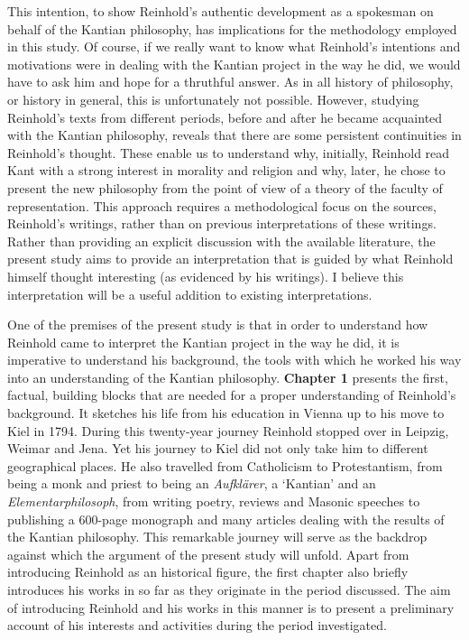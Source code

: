This intention, to show Reinhold's authentic development as a spokesman on behalf of the Kantian philosophy, has implications for the methodology employed in this study. Of course, if we really want to know what Reinhold's intentions and motivations were in dealing with the Kantian project in the way he did, we would have to ask him and hope for a thruthful answer. As in all history of philosophy, or history in general, this is unfortunately not possible. However, studying Reinhold's texts from different periods, before and after he became acquainted with the Kantian philosophy, reveals that there are some persistent continuities in Reinhold's thought. These enable us to understand why, initially, Reinhold read Kant with a strong interest in morality and religion and why, later, he chose to present the new philosophy from the point of view of a theory of the faculty of representation. This approach requires a methodological focus on the sources, Reinhold's writings, rather than on previous interpretations of these writings. Rather than providing an explicit discussion with the available literature, the present study aims to provide an interpretation that is guided by what Reinhold himself thought interesting (as evidenced by his writings). I believe this interpretation will be a useful addition to existing interpretations. 

One of the premises of the present study is that in order to understand how Reinhold came to interpret the Kantian project in the way he did, it is imperative to understand his background, the tools with which he worked his way into an understanding of the Kantian philosophy. \textbf{Chapter 1} presents the first, factual, building blocks that are needed for a proper understanding of Reinhold's background. It sketches his life from his education in Vienna up to his move to Kiel in 1794. During this twenty{-}year journey Reinhold stopped over in Leipzig, Weimar and Jena. Yet his journey to Kiel did not only take him to different geographical places. He also travelled from Catholicism to Protestantism, from being a monk and priest to being an \textit{Aufkl\"{a}rer}, a `Kantian' and an \textit{Elementarphilosoph}, from writing poetry, reviews and Masonic speeches to publishing a 600{-}page monograph and many articles dealing with the results of the Kantian philosophy. This remarkable journey will serve as the backdrop against which the argument of the present study will unfold. Apart from introducing Reinhold as an historical figure, the first chapter also briefly introduces his works in so far as they originate in the period discussed. The aim of introducing Reinhold and his works in this manner is to present a preliminary account of his interests and activities during the period investigated. 

